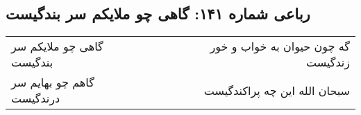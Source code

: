 \begin{center}
\section*{رباعی شماره ۱۴۱: گاهی چو ملایکم سر بندگیست}
\label{sec:sh141}
\begin{longtable}{l p{0.5cm} r}
گاهی چو ملایکم سر بندگیست
&&
گه چون حیوان به خواب و خور زندگیست
\\
گاهم چو بهایم سر درندگیست
&&
سبحان الله این چه پراکندگیست
\\
\end{longtable}
\end{center}
